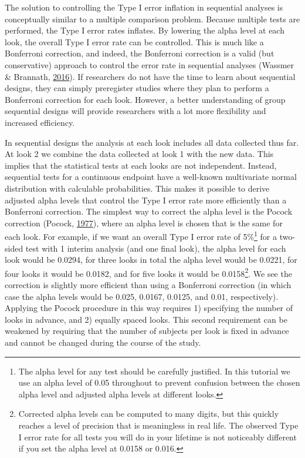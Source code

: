 \documentclass[
  english,
  ,man,floatsintext]{apa6}
\begin{document}
The solution to controlling the Type I error inflation in sequential analyses is conceptually similar to a multiple comparison problem. Because multiple tests are performed, the Type I error rates inflates. By lowering the alpha level at each look, the overall Type I error rate can be controlled. This is much like a Bonferroni correction, and indeed, the Bonferroni correction is a valid (but conservative) approach to control the error rate in sequential analyses (Wassmer \& Brannath, \protect\hyperlink{ref-wassmer_group_2016}{2016}). If researchers do not have the time to learn about sequential designs, they can simply preregister studies where they plan to perform a Bonferroni correction for each look. However, a better understanding of group sequential designs will provide researchers with a lot more flexibility and increased efficiency.

In sequential designs the analysis at each look includes all data collected thus far. At look 2 we combine the data collected at look 1 with the new data. This implies that the statistical tests at each looks are not independent. Instead, sequential tests for a continuous endpoint have a well-known multivariate normal distribution with calculable probabilities. This makes it possible to derive adjusted alpha levels that control the Type I error rate more efficiently than a Bonferroni correction. The simplest way to correct the alpha level is the Pocock correction (Pocock, \protect\hyperlink{ref-pocock_group_1977}{1977}), where an alpha level is chosen that is the same for each look. For example, if we want an overall Type I error rate of 5\%\footnote{The alpha level for any test should be carefully justified. In this tutorial we use an alpha level of 0.05 throughout to prevent confusion between the chosen alpha level and adjusted alpha levels at different looks.} for a two-sided test with 1 interim analysis (and one final look), the alpha level for each look would be 0.0294, for three looks in total the alpha level would be 0.0221, for four looks it would be 0.0182, and for five looks it would be 0.0158\footnote{Corrected alpha levels can be computed to many digits, but this quickly reaches a level of precision that is meaningless in real life. The observed Type I error rate for all tests you will do in your lifetime is not noticeably different if you set the alpha level at 0.0158 or 0.016.}. We see the correction is slightly more efficient than using a Bonferroni correction (in which case the alpha levels would be 0.025, 0.0167, 0.0125, and 0.01, respectively). Applying the Pocock procedure in this way requires 1) specifying the number of looks in advance, and 2) equally spaced looks. This second requirement can be weakened by requiring that the number of subjects per look is fixed in advance and cannot be changed during the course of the study.
\end{document}
